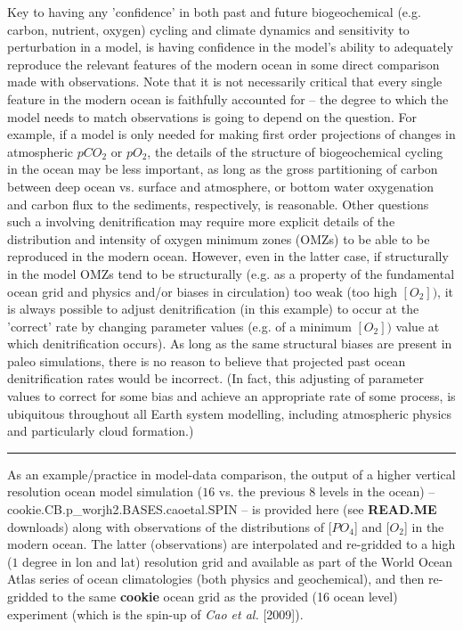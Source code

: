 Key  to having any 'confidence' in both past and future biogeochemical (e.g. carbon, nutrient, oxygen) cycling and climate dynamics and sensitivity to perturbation in a model, is having confidence in the model's ability to adequately reproduce the relevant features of the modern ocean in some direct comparison made with observations. Note that it is not necessarily critical that every single feature in the modern ocean is faithfully accounted for -- the degree to which the model needs  to match observations is going to depend on the question. For example, if a model is only needed for making first order projections of changes in atmospheric \(pCO_{2}\) or \(pO_{2}\), the details of the structure of biogeochemical cycling in the ocean may be less important, as long as the gross partitioning of carbon between deep ocean vs. surface and atmosphere, or  bottom water oxygenation and carbon flux to the sediments, respectively, is reasonable. Other questions such a involving denitrification may require more explicit details of the distribution and intensity of oxygen minimum zones (OMZs) to be able to be reproduced in the modern ocean. However, even in the latter case, if structurally in the model OMZs tend to be structurally (e.g. as a property of the fundamental ocean grid and physics and/or biases in circulation) too weak (too high \([O_{2}])\), it is always possible to adjust denitrification (in this example) to occur at the 'correct' rate by changing parameter values (e.g. of a minimum \([O_{2}])\) value at which denitrification occurs). As long as the same structural biases are present in paleo simulations, there is no reason to believe that projected past ocean denitrification rates would be incorrect. (In fact, this adjusting of parameter values to correct for some bias and achieve an appropriate rate of some process, is ubiquitous throughout all Earth system modelling, including atmospheric physics and particularly cloud formation.)

\vspace{1mm}
\noindent\rule{4cm}{0.5pt}
\vspace{2mm}

\noindent As an example/practice in model-data comparison, the output of a higher vertical resolution ocean model simulation (\(16\) vs. the previous \(8\) levels in the ocean) -- \textsf{\footnotesize cookie.CB.p\_worjh2.BASES.caoetal.SPIN} -- is provided here (see \textbf{READ.ME} downloads) along with observations of the distributions of \([PO_{4}\)] and \([O_{2}\)] in the modern ocean. The latter (observations) are interpolated and re-gridded to a high (\(1\) degree in lon and lat) resolution grid and available as part of the World Ocean Atlas series of ocean climatologies (both physics and geochemical), and then re-gridded to the same \textbf{cookie} ocean grid as the provided (16 ocean level) experiment (which is the spin-up of \textit{Cao et al.} [2009]).

